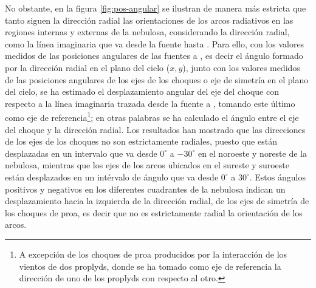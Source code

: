  No obstante, en la figura \ref{fig:pos-angular} se ilustran de manera más estricta que tanto siguen la dirección radial las orientaciones de los arcos radiativos en las regiones internas y externas  de la nebulosa, considerando la dirección radial, como la línea imaginaria que va desde la fuente hasta \thC{}. Para ello, con los valores medidos de las posiciones angulares de las fuentes a \thC{}, es decir el ángulo formado por la dirección radial en el plano del cielo (\(x, y\)), junto con los valores medidos de las posiciones angulares de los ejes de los choques o eje de simetría en el plano del cielo, se ha estimado el desplazamiento angular del eje del choque con respecto a la línea imaginaria trazada desde la fuente a \thC{}, tomando este último como eje de referencia\footnote{A excepción de los choques de proa producidos por la interacción de los vientos de dos proplyds, donde se ha tomado como eje de referencia la dirección de uno de los proplyds con respecto al otro.}; en otras palabras se ha calculado el ángulo entre el eje del choque y la dirección radial. Los resultados han mostrado que las direcciones de los ejes de los choques no son estrictamente radiales, puesto que están desplazadas en un intervalo que va desde \(0^{\circ}\) a \(-30^{\circ}\) en el noroeste y noreste de la nebulosa, mientras que los ejes de los arcos ubicados en el sureste y suroeste están desplazados en un intérvalo de ángulo que va desde \(0^{\circ}\) a \(30^{\circ}\). Estos ángulos positivos y negativos en los diferentes cuadrantes de la nebulosa indican un desplazamiento hacia la izquierda de la dirección radial, de los ejes de simetría de los choques de proa, es decir que no es estrictamente radial la orientación de los arcos. \\


